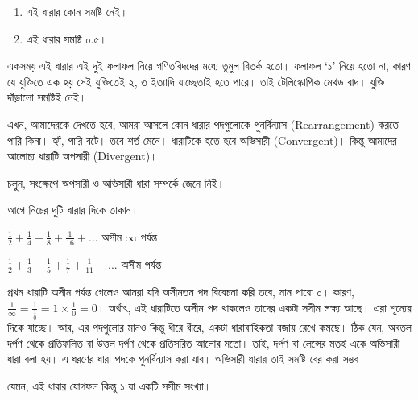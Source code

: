 \documentclass[
]{book}
\providecommand{\tightlist}{%
  \setlength{\itemsep}{0pt}\setlength{\parskip}{0pt}}
\begin{document}
\begin{enumerate}
\def\labelenumi{\arabic{enumi}.}
\tightlist
\item
  এই ধারার কোন সমষ্টি নেই।
\item
  এই ধারার সমষ্টি ০.৫।
\end{enumerate}

একসময় এই ধারার এই দুই ফলাফল নিয়ে গণিতবিদদের মধ্যে তুমুল বিতর্ক হতো। ফলাফল `১' নিয়ে হতো না, কারণ যে যুক্তিতে এক হয় সেই যুক্তিতেই ২, ৩ ইত্যাদি যাচ্ছেতাই হতে পারে। তাই টেলিস্কোপিক মেথড বাদ। যুক্তি দাঁড়ালো সমষ্টিই নেই।

এখন, আমাদেরকে দেখতে হবে, আমরা আসলে কোন ধারার পদগুলোকে পুনর্বিন্যাস (Rearrangement) করতে পারি কিনা। হ্যাঁ, পারি বটে। তবে শর্ত মেনে। ধারাটিকে হতে হবে অভিসারী (Convergent)। কিন্তু আমাদের আলোচ্য ধারাটি অপসারী (Divergent)।

চলুন, সংক্ষেপে অপসারী ও অভিসারী ধারা সম্পর্কে জেনে নিই।

আগে নিচের দুটি ধারার দিকে তাকান।

\(\frac 1 2 + \frac 1 4 + \frac 1 8 + \frac 1 {16} + ...\) অসীম \(\infty\) পর্যন্ত

\(\frac 1 2 + \frac 1 3 + \frac 1 5 + \frac 1 7 + \frac 1 {11} + ...\) অসীম পর্যন্ত

প্রথম ধারাটি অসীম পর্যন্ত গেলেও আমরা যদি অসীমতম পদ বিবেচনা করি তবে, মান পাবো ০। কারণ, \(\frac{1}{\infty}=\frac 1 {\frac{1}{0}}=1 \times \frac{1}{0}=0\)। অর্থাৎ, এই ধারাটিতে অসীম পদ থাকলেও তাদের একটা সসীম লক্ষ্য আছে। এরা শূন্যের দিকে যাচ্ছে। আর, এর পদগুলোর মানও কিন্তু ধীরে ধীরে, একটা ধারাবাহিকতা বজায় রেখে কমছে। ঠিক যেন, অবতল দর্পণ থেকে প্রতিফলিত বা উত্তল দর্পণ থেকে প্রতিসরিত আলোর মতো। তাই, দর্পণ বা লেন্সের মতই একে অভিসারী ধারা বলা হয়। এ ধরণের ধারা পদকে পুনর্বিন্যাস করা যাব। অভিসারী ধারার তাই সমষ্টি বের করা সম্ভব।

যেমন, এই ধারার যোগফল কিন্তু ১ যা একটি সসীম সংখ্যা।
\end{document}
